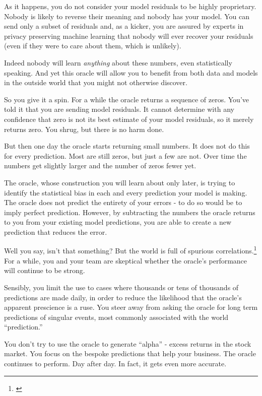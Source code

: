 As it happens, you do not consider your model residuals to be highly proprietary. Nobody is likely to reverse their meaning and nobody has your model. You can send only a subset of residuals and, as a kicker, you are assured by experts in privacy preserving machine learning that nobody will ever recover your residuals (even if they were to care about them, which is unlikely). 

Indeed nobody will learn {\em anything} about these numbers, even statistically speaking. And yet this oracle will allow you to benefit from both data and models in the outside world that you might not otherwise discover. 

So you give it a spin. For a while the oracle returns a sequence of zeros. You've told it that you are sending model residuals. It cannot determine with any confidence that zero is not its best estimate of your model residuals, so it merely returns zero. You shrug, but there is no harm done. 


But then one day the oracle starts returning small numbers. It does not do this for every prediction. Most are still zeros, but just a few are not. Over time the numbers get slightly larger and the number of zeros fewer yet.  


The oracle, whose construction you will learn about only later, is trying to identify the statistical bias in each and every prediction your model is making. The oracle does not predict the entirety of your errors - to do so would be to imply perfect prediction. However, by subtracting the numbers the oracle returns to you from your existing model predictions, you are able to create a new prediction that reduces the error.  

Well you say, isn't that something? But the world is full of spurious correlations.\footnote{\cite{spurious}} For a while, you and your team are skeptical whether the oracle's performance will continue to be strong. 


Sensibly, you limit the use to cases where thousands or tens of thousands of predictions are made daily, in order to reduce the likelihood that the oracle's apparent prescience is a ruse. You steer away from asking the oracle for long term predictions of singular events, most commonly associated with the world ``prediction.'' 

You don't try to use the oracle to generate ``alpha'' - excess returns in the stock market. You focus on the bespoke predictions that help your business.  The oracle continues to perform. Day after day. In fact, it gets even more accurate. 

